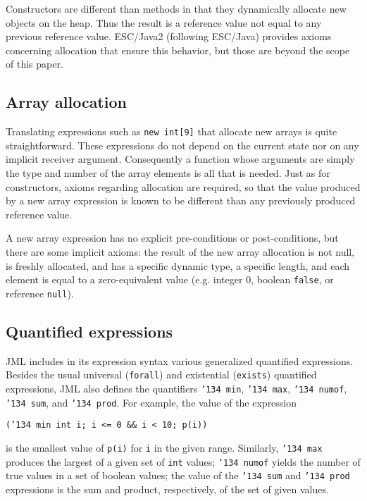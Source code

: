 \documentclass{sig-alternate}
\begin{document}
Constructors are different than methods in that they dynamically allocate new objects on the 
heap.  Thus the result is a reference value not equal to any previous reference value.  ESC/Java2
(following ESC/Java) provides axioms concerning allocation that ensure this behavior, but 
those are beyond the scope of this paper.

\subsection{Array allocation}

Translating expressions such as \texttt{new int[9]} that allocate new arrays is quite straightforward.
These expressions do not depend on the current state nor on any implicit receiver argument.
Consequently a function whose arguments are simply the type and number of the array 
elements is all that is needed.
Just as for constructors, axioms regarding allocation are required, 
so that the value produced by a new array
expression is known to be different than any previously produced reference value.

A new array expression has no explicit pre-conditions or post-conditions, but there are some implicit axioms:
the result of the new array allocation is not null, is freshly allocated,
 and has a specific dynamic type, 
a specific length, and each
element is equal to a zero-equivalent value (e.g. integer 0, boolean \texttt{false}, or
reference \texttt{null}).

\subsection{Quantified expressions}

JML includes in its expression syntax various generalized quantified expressions.  Besides
the usual universal (\texttt{forall}) and existential (\texttt{exists}) quantified expressions, JML
also defines the quantifiers \texttt{\char'134 min}, \texttt{\char'134 max}, \texttt{\char'134 numof},
\texttt{\char'134 sum}, and \texttt{\char'134 prod}.  For example, the value of the expression
\begin{center} \texttt{(\char'134 min int i; i <= 0 \&\& i < 10; p(i))} \end{center}
is the smallest value of \texttt{p(i)} for \texttt{i} in the given range.  Similarly, \texttt{\char'134 max}
produces the largest of a given set of \texttt{int} values;  \texttt{\char'134 numof} yields the number
of true values in a set of boolean values; the value of the
 \texttt{\char'134 sum} and \texttt{\char'134 prod}
expressions is the sum and product, respectively, of the set of given values.
\end{document}
